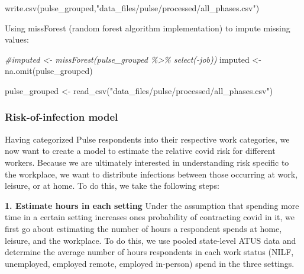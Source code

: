 \documentclass[
]{article}
\newenvironment{Shaded}{\begin{snugshade}}{\end{snugshade}}
\newcommand{\CommentTok}[1]{\textcolor[rgb]{0.56,0.35,0.01}{\textit{#1}}}
\newcommand{\FunctionTok}[1]{\textcolor[rgb]{0.00,0.00,0.00}{#1}}
\newcommand{\NormalTok}[1]{#1}
\newcommand{\OtherTok}[1]{\textcolor[rgb]{0.56,0.35,0.01}{#1}}
\newcommand{\StringTok}[1]{\textcolor[rgb]{0.31,0.60,0.02}{#1}}
\begin{document}
\begin{Shaded}
\begin{Highlighting}[]
\FunctionTok{write.csv}\NormalTok{(pulse\_grouped,}\StringTok{"data\_files/pulse/processed/all\_phases.csv"}\NormalTok{)}
\end{Highlighting}
\end{Shaded}

Using missForest (random forest algorithm implementation) to impute
missing values:

\begin{Shaded}
\begin{Highlighting}[]
\CommentTok{\#imputed \textless{}{-} missForest(pulse\_grouped \%\textgreater{}\% select({-}job))}
\NormalTok{imputed }\OtherTok{\textless{}{-}} \FunctionTok{na.omit}\NormalTok{(pulse\_grouped)}
\end{Highlighting}
\end{Shaded}

\begin{Shaded}
\begin{Highlighting}[]
\NormalTok{pulse\_grouped }\OtherTok{\textless{}{-}} \FunctionTok{read\_csv}\NormalTok{(}\StringTok{"data\_files/pulse/processed/all\_phases.csv"}\NormalTok{)}
\end{Highlighting}
\end{Shaded}

\hypertarget{risk-of-infection-model}{%
\subsubsection{Risk-of-infection model}\label{risk-of-infection-model}}

Having categorized Pulse respondents into their respective work
categories, we now want to create a model to estimate the relative covid
risk for different workers. Because we are ultimately interested in
understanding risk specific to the workplace, we want to distribute
infections between those occurring at work, leisure, or at home. To do
this, we take the following steps:

\textbf{1. Estimate hours in each setting} Under the assumption that
spending more time in a certain setting increases ones probability of
contracting covid in it, we first go about estimating the number of
hours a respondent spends at home, leisure, and the workplace. To do
this, we use pooled state-level ATUS data and determine the average
number of hours respondents in each work status (NILF, unemployed,
employed remote, employed in-person) spend in the three settings.
\end{document}
